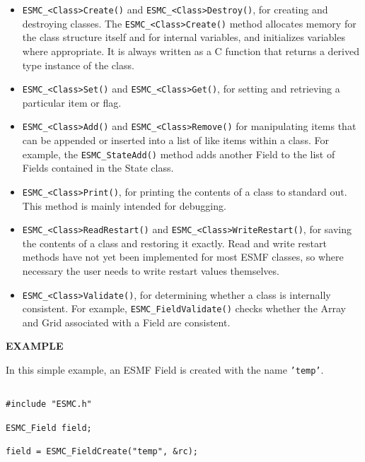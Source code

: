 \begin{itemize}

\item {\tt ESMC\_<Class>Create()} and {\tt ESMC\_<Class>Destroy()}, for creating and 
destroying classes.  The {\tt ESMC\_<Class>Create()} method allocates 
memory for the class structure itself and for internal variables, and
initializes variables where appropriate.  It is always written as a 
C function that returns a derived type instance of the class.

\item {\tt ESMC\_<Class>Set()} and {\tt ESMC\_<Class>Get()}, for setting 
and retrieving a particular item or flag.

\item {\tt ESMC\_<Class>Add()} and 
{\tt ESMC\_<Class>Remove()} for manipulating 
items that can be appended or inserted into a list of like
items within a class.  For example, the {\tt ESMC\_StateAdd()}
method adds another Field to the list of Fields contained
in the State class.

\item {\tt ESMC\_<Class>Print()}, for printing the contents of a class to 
standard out.  This method is mainly intended for debugging.

\item {\tt ESMC\_<Class>ReadRestart()} and {\tt ESMC\_<Class>WriteRestart()}, 
for saving the contents of a class and restoring it exactly.  Read
and write restart methods have not yet been implemented for most
ESMF classes, so where necessary the user needs to write restart 
values themselves.

\item {\tt ESMC\_<Class>Validate()}, for determining whether a class is 
internally consistent. \newline
For example, {\tt ESMC\_FieldValidate()} checks 
whether the Array and Grid associated with a Field are consistent.

\end{itemize}

{\bf EXAMPLE}

In this simple example, an ESMF Field is created with the 
name {\tt 'temp'}.  

\begin{verbatim}

#include "ESMC.h"

ESMC_Field field;

field = ESMC_FieldCreate("temp", &rc);

\end{verbatim}

